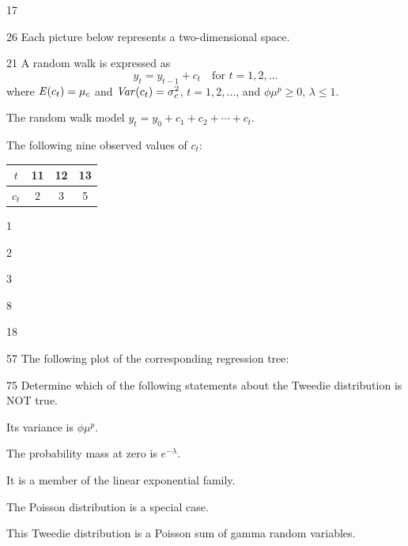 \begin{question}{17}
\deleted
\end{question}

\begin{question}{26}
Each picture below represents a two-dimensional space.
\end{question}

\begin{question}{21}
A random walk is expressed as
\[ y_t = y_{t-1} + c_t \quad \text{for } t = 1,2,\ldots \]
where $\operatorname{\mathit{E}}(c_t) = \mu_c$ and $\operatorname{\mathit{Var}}(c_t) = \sigma_c^2$, $t = 1,2,\ldots$, and
$\phi\mu^p \geqslant 0$, $\lambda \leqslant 1$.
\begin{given}
\item The random walk model $y_t = y_0 + c_1 + c_2 + \cdots + c_t$.
\item The following nine observed values of $c_t$:
\begin{center}\begin{tabular}{|c|c|c|c|}\hline
$t$ & 11 & 12 & 13 \\ \hline
$c_t$ & 2 & 3 & 5 \\ \hline
\end{tabular}\end{center}
\end{given}
\begin{choices}
\item 1
\item 2
\item 3
\item 8
\item 18
\end{choices}
\end{question}

\begin{question}{57}
The following plot of the corresponding regression tree:
\end{question}

\begin{question}{75}
Determine which of the following statements about the Tweedie distribution is NOT true.
\begin{choices}
\item Its variance is $\phi\mu^{p}$.
\item The probability mass at zero is $e^{-\lambda}$.
\item It is a member of the linear exponential family.
\item The Poisson distribution is a special case.
\item This Tweedie distribution is a Poisson sum of gamma random variables.
\end{choices}
\end{question}

